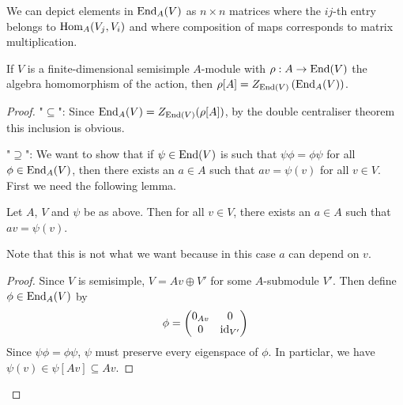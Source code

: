 \begin{cor}
	We can depict elements in $\operatorname{End}_A(V)$ as $n \times n$ matrices where the $ij$-th entry belongs to $\operatorname{Hom}_A(V_j,V_i)$ and where composition of maps corresponds to matrix multiplication.
\end{cor}

\begin{thm}
	If $V$ is a finite-dimensional semisimple $A$-module with $\rho:A \to \operatorname{End}(V)$ the algebra homomorphism of the action, then $\rho[A] = Z_{\operatorname{End}(V)}\left(\operatorname{End}_A(V)\right)$.
\end{thm}

\begin{proof}
  "$\subseteq$":
  Since $\operatorname{End}_A(V) = Z_{\operatorname{End}(V)}(\rho[A])$, by the double centraliser theorem this inclusion is obvious.

  "$\supseteq$":
  We want to show that if $\psi \in \operatorname{End}(V)$ is such that $\psi\phi = \phi\psi$ for all $\phi\in\operatorname{End}_A(V)$, then there exists an $a \in A$ such that $av = \psi(v)$ for all $v \in V$.
  First we need the following lemma.
    
\begin{lem}
	Let $A$, $V$ and $\psi$ be as above.
    Then for all $v \in V$, there exists an $a \in A$ such that $av = \psi(v)$.
\end{lem}

Note that this is not what we want because in this case $a$ can depend on $v$.

\begin{proof}
	Since $V$ is semisimple, $V = Av \oplus V'$ for some $A$-submodule $V'$.
    Then define $\phi\in\operatorname{End}_A(V)$ by
    \[
    	\phi =
        \begin{pmatrix}
        	0_{Av} & 0 \\
            0 & \operatorname{id}_{V'}
        \end{pmatrix}
    \]
    Since $\psi\phi = \phi\psi$, $\psi$ must preserve every eigenspace of $\phi$. 
    In particlar, we have $\psi(v) \in \psi[Av] \subseteq Av$.
\end{proof}


\end{proof}
